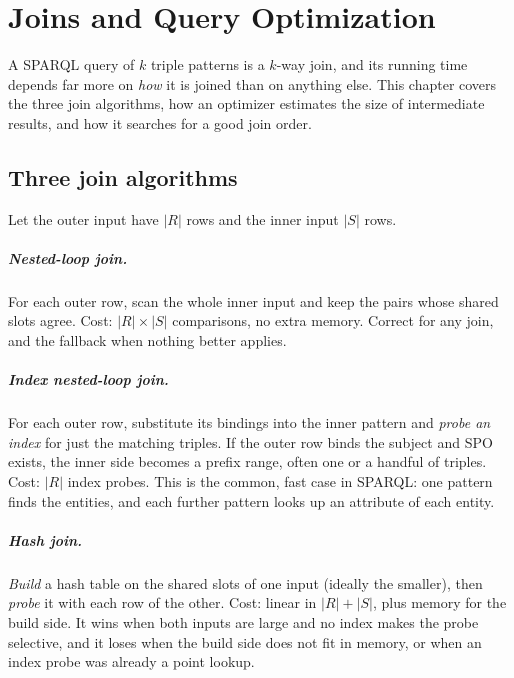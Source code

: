 \chapter{Joins and Query Optimization}
\label{ch:joins}

A SPARQL query of $k$ triple patterns is a $k$-way join, and its running time
depends far more on \emph{how} it is joined than on anything else. This chapter
covers the three join algorithms, how an optimizer estimates the size of
intermediate results, and how it searches for a good join order.

\section{Three join algorithms}

Let the outer input have $|R|$ rows and the inner input $|S|$ rows.

\paragraph{Nested-loop join.} For each outer row, scan the whole inner input and
keep the pairs whose shared slots agree. Cost: $|R| \times |S|$ comparisons, no
extra memory. Correct for any join, and the fallback when nothing better applies.

\paragraph{Index nested-loop join.} For each outer row, substitute its bindings
into the inner pattern and \emph{probe an index} for just the matching triples.
If the outer row binds the subject and SPO exists, the inner side becomes a
prefix range, often one or a handful of triples. Cost: $|R|$ index probes. This
is the common, fast case in SPARQL: one pattern finds the entities, and each
further pattern looks up an attribute of each entity.

\paragraph{Hash join.} \emph{Build} a hash table on the shared slots of one input
(ideally the smaller), then \emph{probe} it with each row of the other. Cost:
linear in $|R| + |S|$, plus memory for the build side. It wins when both inputs
are large and no index makes the probe selective, and it loses when the build
side does not fit in memory, or when an index probe was already a point lookup.

